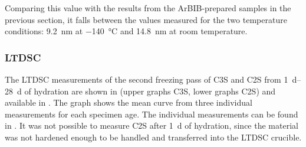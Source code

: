 Comparing this value with the results from the \ac{ArBIB}-prepared samples in the previous section, it falls between the values measured for the two temperature conditions: \qty{9.2}{\nano\meter} at \qty{-140}{\celsius} and \qty{14.8}{\nano\meter} at room temperature.




\FloatBarrier
\subsubsection{\acs{LTDSC}}

The \ac{LTDSC} measurements of the second freezing pass of \ac{C3S} and \ac{C2S} from \qtyrange{1}{28}{\day} of hydration are shown in  (upper graphs \ac{C3S}, lower graphs \ac{C2S}) and available in \cite{kleiner.2026h}.
The graph shows the mean curve from three individual measurements for each specimen age.
The individual measurements can be found in .
It was not possible to measure \ac{C2S} after \qty{1}{\day} of hydration, since the material was not hardened enough to be handled and transferred into the \ac{LTDSC} crucible.


